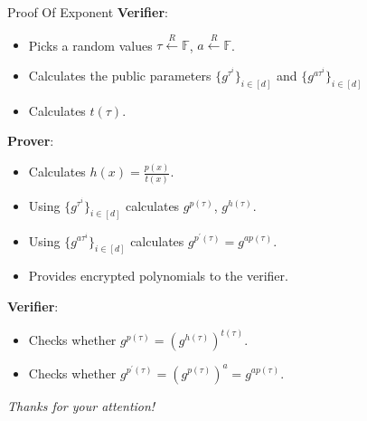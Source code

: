\documentclass{zkdl-presentation-template}
\begin{document}
    \begin{frame}{Proof Of Exponent}
        \textbf{Verifier}: 
        \vspace{-5pt}
        \begin{itemize}[label=]
            \item \vspace{-3pt} Picks a random values $\tau \xleftarrow{R} \mathbb{F}$, $a \xleftarrow{R} \mathbb{F}$. \pause
            \item \vspace{-3pt} Calculates the public parameters $\{g^{\tau^i}\}_{i \in [d]}$ and $\{g^{a\tau^i}\}_{i \in [d]}$ \pause
            \item \vspace{-3pt} Calculates $t(\tau)$. \pause
        \end{itemize}
        \textbf{Prover}: 
        \vspace{-5pt}
        \begin{itemize}[label=]
            \item \vspace{-3pt} Calculates $h(x) = \frac{p(x)}{t(x)}$. \pause
            \item \vspace{-3pt} Using $\{g^{\tau^i}\}_{i \in [d]}$ calculates $g^{p(\tau)}$, $g^{h(\tau)}$. \pause
            \item \vspace{-3pt} Using $\{g^{a\tau^i}\}_{i \in [d]}$ calculates $g^{p^{\prime}(\tau)} = g^{ap(\tau)}$. \pause
            \item \vspace{-3pt} Provides encrypted polynomials to the verifier. \pause
        \end{itemize}
        \textbf{Verifier}: 
        \vspace{-5pt}
        \begin{itemize}[label=]
            \item \vspace{-3pt} Checks whether $g^{p(\tau)} = \left( g^{h(\tau)} \right)^{t(\tau)}$. \pause
            \item \vspace{-3pt} Checks whether $g^{p^{\prime}(\tau)} = \left( g^{p(\tau)} \right)^{a} = g^{ap(\tau)}$. 
        \end{itemize}
    \end{frame}

    \begin{frame}{}
        \centering \Large
        \emph{Thanks for your attention!}
    \end{frame}
\end{document}
